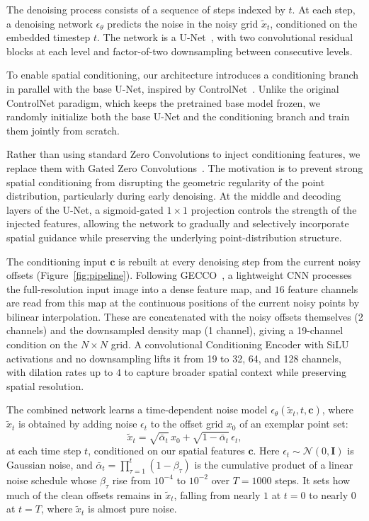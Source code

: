 \documentclass{egpubl}
\begin{document}
The denoising process consists of a sequence of steps indexed by $t$. At each step, a denoising network $\epsilon_{\theta}$ predicts the noise in the noisy grid $\tilde{x}_t$, conditioned on the embedded timestep $t$. 
%
The network is a U-Net~\cite{ronneberger2015unetconvolutionalnetworksbiomedical}, with two convolutional residual blocks at each level and factor-of-two downsampling between consecutive levels.


To enable spatial conditioning, our architecture introduces a conditioning branch in parallel with the base U-Net, inspired by ControlNet~\cite{zhang2023adding}. Unlike the original ControlNet paradigm, which keeps the pretrained base model frozen, we randomly initialize both the base U-Net and the conditioning branch and train them jointly from scratch.
%

Rather than using standard Zero Convolutions to inject conditioning features, we replace them with Gated Zero Convolutions~\cite{srivastava2015highwaynetworks}. The motivation is to prevent strong spatial conditioning from disrupting the geometric regularity of the point distribution, particularly during early denoising. At the middle and decoding layers of the U-Net, a sigmoid-gated $1\times1$ projection controls the strength of the injected features, allowing the network to gradually and selectively incorporate spatial guidance while preserving the underlying point-distribution structure.


The conditioning input $\mathbf{c}$ is rebuilt at every denoising step from the current noisy offsets (Figure~\ref{fig:pipeline}). Following GECCO~\cite{tyszkiewicz2023geccogeometricallyconditionedpointdiffusion}, a lightweight CNN processes the full-resolution input image into a dense feature map, and $16$ feature channels are read from this map at the continuous positions of the current noisy points by bilinear interpolation. These are concatenated with the noisy offsets themselves (2 channels) and the downsampled density map (1 channel), giving a 19-channel condition on the $N\times N$ grid. A convolutional Conditioning Encoder with SiLU activations and no downsampling lifts it from 19 to 32, 64, and 128 channels, with dilation rates up to $4$ to capture broader spatial context while preserving spatial resolution.



The combined network learns a time-dependent noise model $\epsilon_{\theta}(\tilde{x}_t, t, \mathbf{c})$, where $\tilde{x}_t$ is obtained by adding noise $\epsilon_t$ to the offset grid $x_0$ of an exemplar point set:
$$
\tilde{x}_t = \sqrt{\bar{\alpha}_t}\,x_0 + \sqrt{1-\bar{\alpha}_t}\,\epsilon_t,
$$
at each time step $t$, conditioned on our spatial features $\mathbf{c}$. Here $\epsilon_t\sim\mathcal{N}(0,\mathbf{I})$ is Gaussian noise, and $\bar{\alpha}_t=\prod_{\tau=1}^{t}(1-\beta_\tau)$ is the cumulative product of a linear noise schedule whose $\beta_\tau$ rise from $10^{-4}$ to $10^{-2}$ over $T=1000$ steps. It sets how much of the clean offsets remains in $\tilde{x}_t$, falling from nearly $1$ at $t=0$ to nearly $0$ at $t=T$, where $\tilde{x}_t$ is almost pure noise.
\end{document}
